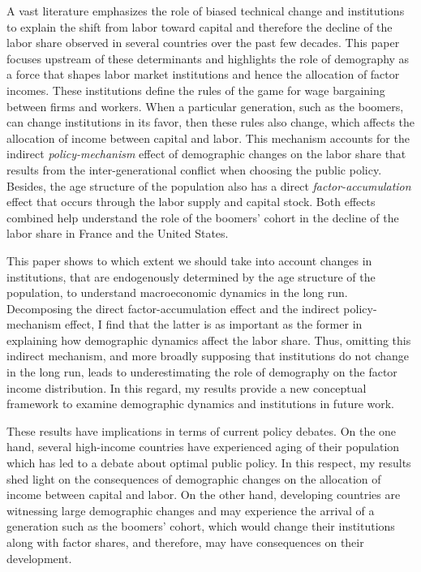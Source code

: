 A vast literature emphasizes the role of biased technical change and institutions to explain the shift from labor toward capital and therefore the decline of the labor share observed in several countries over the past few decades. This paper focuses upstream of these determinants and highlights the role of demography as a force that shapes labor market institutions and hence the allocation of factor incomes. These institutions define the rules of the game for wage bargaining between firms and workers. When a particular generation, such as the boomers, can change institutions in its favor, then these rules also change, which affects the allocation of income between capital and labor. This mechanism accounts for the indirect \textit{policy-mechanism} effect of demographic changes on the labor share that results from the inter-generational conflict when choosing the public policy. Besides, the age structure of the population also has a direct \textit{factor-accumulation} effect that occurs through the labor supply and capital stock. Both effects combined help understand the role of the boomers' cohort in the decline of the labor share in France and the United States.

This paper shows to which extent we should take into account changes in institutions, that are endogenously determined by the age structure of the population, to understand macroeconomic dynamics in the long run. Decomposing the direct factor-accumulation effect and the indirect policy-mechanism effect, I find that the latter is as important as the former in explaining how demographic dynamics affect the labor share. Thus, omitting this indirect mechanism, and more broadly supposing that institutions do not change in the long run, leads to underestimating the role of demography on the factor income distribution. In this regard, my results provide a new conceptual framework to examine demographic dynamics and institutions in future work.

These results have implications in terms of current policy debates. On the one hand, several high-income countries have experienced aging of their population which has led to a debate about optimal public policy. In this respect, my results shed light on the consequences of demographic changes on the allocation of income between capital and labor. On the other hand, developing countries are witnessing large demographic changes and may experience the arrival of a generation such as the boomers' cohort, which would change their institutions along with factor shares, and therefore, may have consequences on their development.